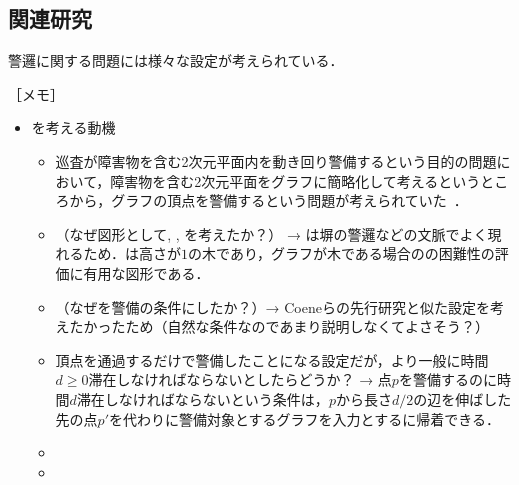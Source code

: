 \subsection*{関連研究}

警邏に関する問題には様々な設定が考えられている．

［メモ］
\begin{itemize}
  \item {\patProb}を考える動機
  \begin{itemize}
    \item 巡査が障害物を含む2次元平面内を動き回り警備するという目的の問題において，障害物を含む2次元平面をグラフに簡略化して考えるというところから，グラフの頂点を警備するという問題が考えられていた~\cite{machado2002multi}．
    \item （なぜ図形として{\graphLine}, {\graphStar}, {\graphUnit}を考えたか？） → {\graphLine}は塀の警邏などの文脈でよく現れるため．{\graphStar}は高さが$1$の木であり，グラフが木である場合の{\patProb}の困難性の評価に有用な図形である．
    \item （なぜ{\maxIdletime}を警備の条件にしたか？）→ Coeneらの先行研究と似た設定を考えたかったため（自然な条件なのであまり説明しなくてよさそう？）
    \item 頂点を通過するだけで警備したことになる設定だが，より一般に時間$d \geq 0$滞在しなければならないとしたらどうか？ → 点$p$を警備するのに時間$d$滞在しなければならないという条件は，$p$から長さ$d/2$の辺を伸ばした先の点$p'$を代わりに警備対象とするグラフを入力とする{\patProb}に帰着できる．
    \item 
    \item 
  \end{itemize}


\end{itemize}
